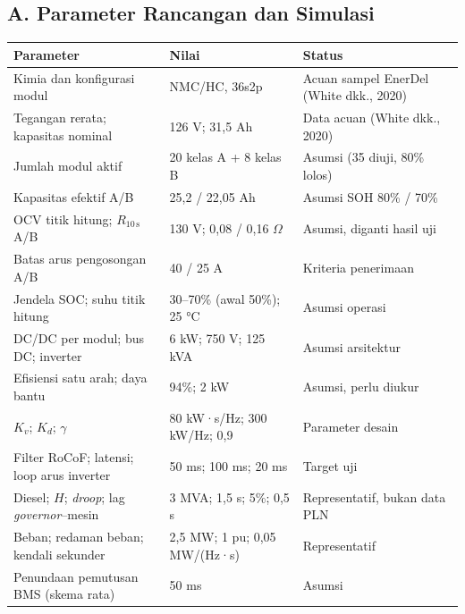 \documentclass[12pt,a4paper,twocolumn]{article}
\newcommand{\eng}[1]{\textit{#1}}
\begin{document}
\subsection*{A. Parameter Rancangan dan Simulasi}
\begin{center}
\small
\begin{tabular}{|p{6.0cm}|p{4.6cm}|p{5.4cm}|}
\hline
\textbf{Parameter} & \textbf{Nilai} & \textbf{Status} \\
\hline
Kimia dan konfigurasi modul & NMC/HC, 36s2p & Acuan sampel EnerDel (White dkk., 2020) \\
\hline
Tegangan rerata; kapasitas nominal & 126 V; 31,5 Ah & Data acuan (White dkk., 2020) \\
\hline
Jumlah modul aktif & 20 kelas A + 8 kelas B & Asumsi (35 diuji, 80\% lolos) \\
\hline
Kapasitas efektif A/B & 25,2 / 22,05 Ah & Asumsi SOH 80\% / 70\% \\
\hline
OCV titik hitung; $R_{10\,\mathrm{s}}$ A/B & 130 V; 0,08 / 0,16 $\Omega$ & Asumsi, diganti hasil uji \\
\hline
Batas arus pengosongan A/B & 40 / 25 A & Kriteria penerimaan \\
\hline
Jendela SOC; suhu titik hitung & 30--70\% (awal 50\%); 25 °C & Asumsi operasi \\
\hline
DC/DC per modul; bus DC; inverter & 6 kW; 750 V; 125 kVA & Asumsi arsitektur \\
\hline
Efisiensi satu arah; daya bantu & 94\%; 2 kW & Asumsi, perlu diukur \\
\hline
$K_v$; $K_d$; $\gamma$ & 80 kW·s/Hz; 300 kW/Hz; 0,9 & Parameter desain \\
\hline
Filter RoCoF; latensi; loop arus inverter & 50 ms; 100 ms; 20 ms & Target uji \\
\hline
Diesel; $H$; \eng{droop}; lag \eng{governor}--mesin & 3 MVA; 1,5 s; 5\%; 0,5 s & Representatif, bukan data PLN \\
\hline
Beban; redaman beban; kendali sekunder & 2,5 MW; 1 pu; 0,05 MW/(Hz·s) & Representatif \\
\hline
Penundaan pemutusan BMS (skema rata) & 50 ms & Asumsi \\
\hline
\end{tabular}
\end{center}
\end{document}
